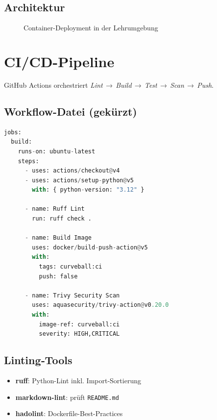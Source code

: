 \documentclass{article}
\begin{document}
\subsection{Architektur}
\begin{figure}[H]
  \centering
  \caption{Container-Deployment in der Lehrumgebung}\label{fig:container}
\end{figure}

\section{CI/CD-Pipeline}
GitHub Actions orchestriert
\emph{Lint\,$\rightarrow$\,Build\,$\rightarrow$\,Test\,$\rightarrow$\,Scan\,$\rightarrow$\,Push}.

\subsection{Workflow-Datei (gekürzt)}
\begin{lstlisting}[language=python,caption={ci.yml – Kernschritte}]
jobs:
  build:
    runs-on: ubuntu-latest
    steps:
      - uses: actions/checkout@v4
      - uses: actions/setup-python@v5
        with: { python-version: "3.12" }

      - name: Ruff Lint
        run: ruff check .

      - name: Build Image
        uses: docker/build-push-action@v5
        with:
          tags: curveball:ci
          push: false

      - name: Trivy Security Scan
        uses: aquasecurity/trivy-action@v0.20.0
        with:
          image-ref: curveball:ci
          severity: HIGH,CRITICAL
\end{lstlisting}

\subsection{Linting‐Tools}
\begin{itemize}
  \item \textbf{ruff}: Python-Lint inkl. Import-Sortierung
  \item \textbf{markdown-lint}: prüft \texttt{README.md}
  \item \textbf{hadolint}: Dockerfile-Best-Practices
\end{itemize}
\end{document}
